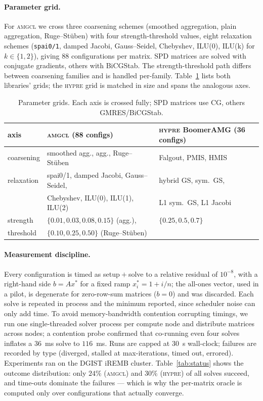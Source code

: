 \documentclass[11pt]{article}
\newcommand{\amgcl}{\textsc{amgcl}}
\newcommand{\hypre}{\textsc{hypre}}
\begin{document}
\paragraph{Parameter grid.}
For \amgcl{} we cross three coarsening schemes (smoothed aggregation,
plain aggregation, Ruge--St\"uben) with four strength-threshold values, eight
relaxation schemes (\texttt{spai0/1}, damped Jacobi, Gauss--Seidel, Chebyshev,
ILU(0), ILU(k) for $k\in\{1,2\}$), giving 88 configurations per matrix. SPD
matrices are solved with conjugate gradients, others with BiCGStab. The
strength-threshold path differs between coarsening families and is handled
per-family. Table~\ref{tab:grid} lists both libraries' grids; the \hypre{}
grid is matched in size and spans the analogous axes.

\begin{table}[t]
\centering
\caption{Parameter grids. Each axis is crossed fully; SPD matrices use CG,
others GMRES/BiCGStab.}
\label{tab:grid}
\small
\begin{tabular}{@{}lll@{}}
\toprule
axis & \amgcl{} (88 configs) & \hypre{} BoomerAMG (36 configs) \\
\midrule
coarsening & smoothed agg., agg., Ruge--St\"uben & Falgout, PMIS, HMIS \\
relaxation & spai0/1, damped Jacobi, Gauss--Seidel, & hybrid GS, sym.\ GS, \\
           & Chebyshev, ILU(0), ILU(1), ILU(2) & L1 sym.\ GS, L1 Jacobi \\
strength   & $\{0.01,0.03,0.08,0.15\}$ (agg.), & $\{0.25, 0.5, 0.7\}$ \\
threshold  & $\{0.10,0.25,0.50\}$ (Ruge--St\"uben) & \\
\bottomrule
\end{tabular}
\end{table}

\paragraph{Measurement discipline.}
Every configuration is timed as setup${}+{}$solve to a relative residual of
$10^{-8}$, with a right-hand side $b = A x^\ast$ for a fixed ramp
$x^\ast_i = 1 + i/n$; the all-ones vector, used in a pilot, is degenerate for
zero-row-sum matrices ($b=0$) and was discarded. Each solve is repeated in
process and the minimum reported, since scheduler noise can only add time. To
avoid memory-bandwidth contention corrupting timings, we run one
single-threaded solver process per compute node and distribute matrices across
nodes; a contention probe confirmed that co-running even four solves inflates a
$36$~ms solve to $116$~ms. Runs are capped at 30~s wall-clock; failures are
recorded by type (diverged, stalled at max-iterations, timed out, errored).
Experiments ran on the DGIST iREMB cluster. Table~\ref{tab:status} shows the
outcome distribution: only $24\%$ (\amgcl{}) and $30\%$ (\hypre{}) of all
solves succeed, and time-outs dominate the failures --- which is why the
per-matrix oracle is computed only over configurations that actually converge.
\end{document}
